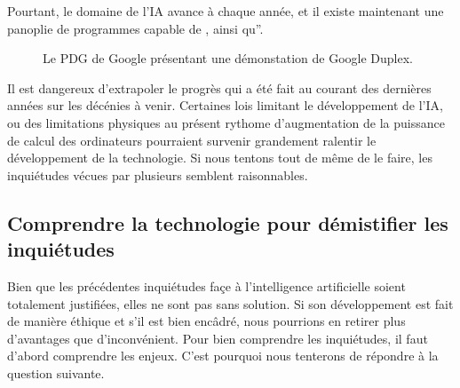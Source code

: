 \documentclass[letterpaper,10pt,french]{sphinxmanual}
\begin{document}
Pourtant, le domaine de l’IA avance à chaque année, et il existe maintenant une
panoplie de programmes capable de
,
ainsi qu”.

\begin{figure}[htbp]
\centering
\capstart

\noindent{}
\caption{Le PDG de Google présentant une démonstation de Google Duplex.}\label{\detokenize{enonce_sujet:duplex-presentation}}\end{figure}

Il est dangereux d’extrapoler le progrès qui a été fait au courant des dernières
années sur les décénies à venir. Certaines lois limitant le développement de
l’IA, ou des limitations physiques au présent rythome d’augmentation de la
puissance de calcul des ordinateurs pourraient survenir grandement ralentir
le développement de la technologie. Si nous tentons tout de même de le faire,
les inquiétudes vécues par plusieurs semblent raisonnables.


\subsection{Comprendre la technologie pour démistifier les inquiétudes}
\label{\detokenize{enonce_sujet:comprendre-la-technologie-pour-demistifier-les-inquietudes}}
Bien que les précédentes inquiétudes façe à l’intelligence artificielle soient
totalement justifiées, elles ne sont pas sans solution. Si son développement
est fait de manière éthique et s’il est bien encâdré, nous pourrions en retirer
plus d’avantages que d’inconvénient. Pour bien comprendre les inquiétudes, il
faut d’abord comprendre les enjeux. C’est pourquoi nous tenterons de répondre
à la question suivante.

\end{document}
